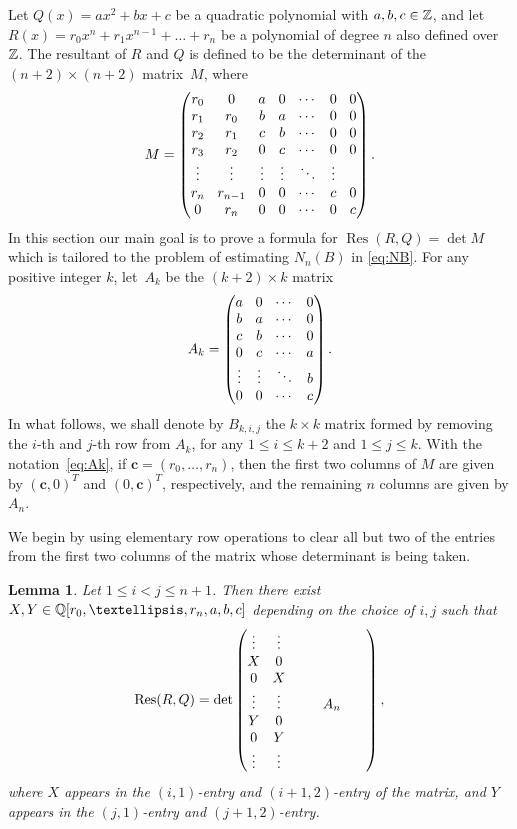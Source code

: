 \documentclass[11pt]{article}
\DeclareMathOperator{\Res}{Res}
\newtheorem{lemma}[theorem]{Lemma}
\numberwithin{equation}{section}
\begin{document}
Let $Q(x)=ax^2+bx+c$ be a quadratic polynomial with $a,b,c\in \mathbb{Z}$, and let
$R(x)=r_0x^n+r_1x^{n-1}+\dots+r_n$ be a polynomial of degree $n$ also defined over $\mathbb{Z}$.
The resultant of $R$ and $Q$ is defined to be
the determinant of the $(n+2)\times (n+2)$ matrix~$M$, where
\[\arraycolsep4.5pt
M=
\begin{pmatrix}
r_0 & 0& a& 0& \cdots & 0 & 0 \\
r_1& r_0 &b& a& \cdots& 0& 0 \\
r_2& r_1&c& b& \cdots & 0& 0\\
r_3 &r_2&0& c& \cdots & 0& 0 \\
\vdots&\vdots& \vdots&\vdots & \ddots & \vdots \\
r_n& r_{n-1}& 0& 0& \cdots & c& 0\\
0& r_n& 0& 0& \cdots & 0 & c
\end{pmatrix}.
\]
In this section our main goal is to prove a formula for
$\Res(R,Q)=\det M$ which is tailored to the problem of estimating $N_n(B)$ in \eqref{eq:NB}.
For any positive integer $k$, let~$A_k$ be the $(k+2)\times k$ matrix
\begin{equation}\label{eq:Ak} \arraycolsep4.5pt
A_k=
\begin{pmatrix}
a& 0& \cdots & 0 \\
b& a& \cdots& 0 \\
c& b& \cdots & 0\\
0& c& \cdots & a \\
\vdots&\vdots & \ddots & b \\
0& 0&\cdots & c
\end{pmatrix}.\end{equation}
In what follows, we shall denote by $B_{k,i,j}$ the $k\times k$ matrix formed by removing the $i$-th and $j$-th row from $A_{k}$, for any $1\leq i\leq k+2$ and $1\leq j\leq k$.
With the notation~\eqref{eq:Ak}, if
$\boldsymbol{c}=(r_0,\dots, r_n)$, then the first two columns of $M$
are given by $(\boldsymbol{c},0)^T$ and $(0,\boldsymbol{c})^T$,
respectively,
and the remaining $n$ columns are given by $A_n$.

We begin by using elementary row operations to clear all but two of the entries from the first two columns of the matrix whose determinant is being taken.

\begin{lemma}\label{lem:res1}
Let $1\leq i<j\leq n+1$. Then there exist $X,Y\in\Q[r_0,\dots, r_n,a,b,c]$ depending on the choice of $i,j$ such that
\[\arraycolsep4.5pt
\Res(R,Q)=
\det
\begin{pmatrix}
\vdots & \vdots & &&&& \\
X & 0 & &&&&\\
0 & X & &&&&\\
\vdots & \vdots &&&A_n&& \\
Y & 0 & &&&&\\
0 & Y & &&&&\\
\vdots & \vdots & &&&&
\end{pmatrix},
\]
where $X$ appears in the $(i,1)$-entry and $(i+1,2)$-entry of the matrix, and $Y$ appears in the $(j,1)$-entry and $(j+1,2)$-entry.
\end{lemma}
\end{document}
